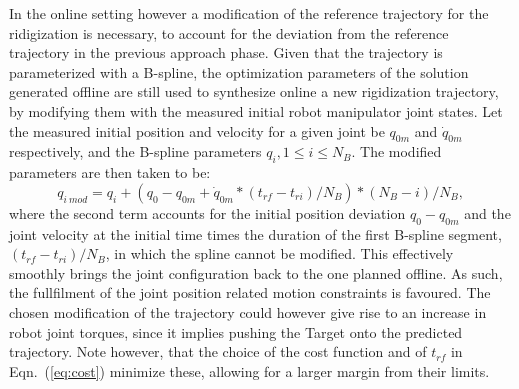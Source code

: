 In the online setting however a modification of the reference trajectory for the ridigization is necessary, to account for the deviation from the reference trajectory in the previous approach phase. Given that the trajectory is parameterized with a B-spline, the optimization parameters of the solution generated offline are still used to synthesize online a new rigidization trajectory, by modifying them with the measured initial robot manipulator joint states. Let the measured initial position and velocity for a given joint be $q_{0m}$ and $\dot{q}_{0m}$ respectively, and the B-spline parameters $q_i, 1 \leq i \leq N_B$. The modified parameters are then taken to be:
\begin{equation}
q_{i \: mod} =   q_i +  (q_0 - q_{0m} + \dot{q}_{0m} * ({t_{rf}}-{t_{ri}})/N_B) * (N_B-i)/N_B,
\end{equation}
where the second term accounts for the initial position deviation $q_0 - q_{0m}$ and the joint velocity at the initial time times the duration of the first B-spline segment, $({t_{rf}}-{t_{ri}})/N_B$, in which the spline cannot be modified. This effectively smoothly brings the joint configuration back to the one planned offline. As such, the fullfilment of the joint position related motion constraints is favoured. The chosen modification of the trajectory could however give rise to an increase in robot joint torques, since it implies pushing the Target onto the predicted trajectory. Note however, that the choice of the cost function and of $t_{rf}$ in Eqn.~(\ref{eq:cost}) minimize these, allowing for a larger margin from their limits.
%
